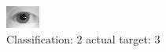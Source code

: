 \begin{figure}[h!]
\begin{center}
\includegraphics[width=0.60\columnwidth]{figures/ID1177_class_2_target_3.png}
\end{center}
\caption{ Classification: 2 actual target: 3}
\label{fig:ID1177_class_2_target_3}
\end{figure}
